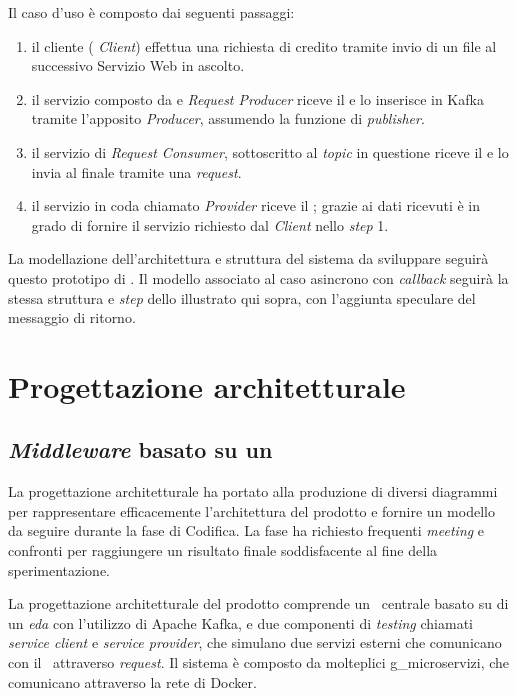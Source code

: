 \noindent
Il caso d'uso è composto dai seguenti passaggi:
\begin{enumerate}
  \item il cliente (\textit{ Client}) effettua una richiesta di credito tramite invio di un file  al successivo Servizio Web in ascolto.
  \item il servizio composto da   e \textit{Request Producer} riceve il  e lo inserisce in Kafka tramite l'apposito \textit{Producer}, assumendo la funzione di \textit{publisher}.
  \item il servizio di \textit{Request Consumer}, sottoscritto al \textit{topic} in questione riceve il  e lo invia al  finale tramite una  \textit{request}.
  \item il servizio in coda chiamato  \textit{Provider} riceve il ; grazie ai dati ricevuti è in grado di fornire il servizio richiesto dal \textit{Client} nello \textit{step} 1.
\end{enumerate}

La modellazione dell'architettura e struttura del sistema da sviluppare seguirà questo prototipo di .
Il modello associato al caso asincrono con \textit{callback} seguirà la stessa struttura e \textit{step} dello  illustrato qui sopra, con l'aggiunta speculare del messaggio di ritorno.

\section{Progettazione architetturale}\label{sec:progettazione}
\subsection{\textit{Middleware} basato su un }

La progettazione architetturale ha portato alla produzione di diversi diagrammi  per rappresentare efficacemente l'architettura del prodotto e fornire un modello da seguire durante la fase di Codifica.
La fase ha richiesto frequenti \textit{meeting} e confronti per raggiungere un risultato finale soddisfacente al fine della sperimentazione.

La progettazione architetturale del prodotto comprende un \middleware\ centrale basato su di un \textit{\acrlong{eda}} con l'utilizzo di Apache Kafka, e due componenti di \textit{testing} chiamati \textit{service client} e \textit{service provider}, che simulano due servizi esterni che comunicano con il \middleware\ attraverso  \textit{request}.
Il sistema è composto da molteplici \gls{g_microservizi}, che comunicano attraverso la rete di Docker.

